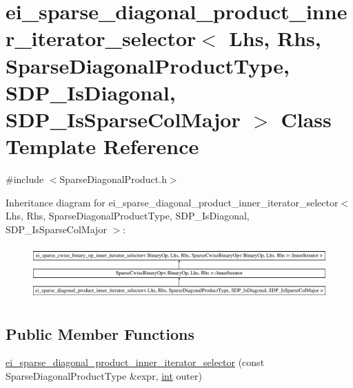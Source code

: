 \hypertarget{classei__sparse__diagonal__product__inner__iterator__selector_3_01_lhs_00_01_rhs_00_01_sparse_didf12bfef072872dc764d3a14c479e3e4}{\section{ei\-\_\-sparse\-\_\-diagonal\-\_\-product\-\_\-inner\-\_\-iterator\-\_\-selector$<$ Lhs, Rhs, Sparse\-Diagonal\-Product\-Type, S\-D\-P\-\_\-\-Is\-Diagonal, S\-D\-P\-\_\-\-Is\-Sparse\-Col\-Major $>$ Class Template Reference}
\label{classei__sparse__diagonal__product__inner__iterator__selector_3_01_lhs_00_01_rhs_00_01_sparse_didf12bfef072872dc764d3a14c479e3e4}
}


{\ttfamily \#include $<$Sparse\-Diagonal\-Product.\-h$>$}

Inheritance diagram for ei\-\_\-sparse\-\_\-diagonal\-\_\-product\-\_\-inner\-\_\-iterator\-\_\-selector$<$ Lhs, Rhs, Sparse\-Diagonal\-Product\-Type, S\-D\-P\-\_\-\-Is\-Diagonal, S\-D\-P\-\_\-\-Is\-Sparse\-Col\-Major $>$\-:\begin{figure}[H]
\begin{center}
\leavevmode
\includegraphics[height=2.094763cm]{classei__sparse__diagonal__product__inner__iterator__selector_3_01_lhs_00_01_rhs_00_01_sparse_didf12bfef072872dc764d3a14c479e3e4}
\end{center}
\end{figure}
\subsection*{Public Member Functions}
\begin{DoxyCompactItemize}
\item 
\hyperlink{classei__sparse__diagonal__product__inner__iterator__selector_3_01_lhs_00_01_rhs_00_01_sparse_didf12bfef072872dc764d3a14c479e3e4_a5582999339b193f994032f0e3edc4928}{ei\-\_\-sparse\-\_\-diagonal\-\_\-product\-\_\-inner\-\_\-iterator\-\_\-selector} (const Sparse\-Diagonal\-Product\-Type \&expr, \hyperlink{ioapi_8h_a787fa3cf048117ba7123753c1e74fcd6}{int} outer)
\end{DoxyCompactItemize}

